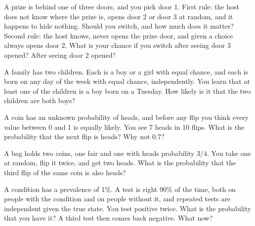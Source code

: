 \begin{question}\label{iq:iv1:conditional-probability-and-bayes:10}
A prize is behind one of three doors, and you pick door 1. First rule: the host does not know where the prize is, opens door 2 or door 3 at random, and it happens to hide nothing. Should you switch, and how much does it matter? Second rule: the host knows, never opens the prize door, and given a choice always opens door 2. What is your chance if you switch after seeing door 3 opened? After seeing door 2 opened?
\end{question}

\begin{question}\label{iq:iv1:conditional-probability-and-bayes:11}
A family has two children. Each is a boy or a girl with equal chance, and each is born on any day of the week with equal chance, independently. You learn that at least one of the children is a boy born on a Tuesday. How likely is it that the two children are both boys?
\end{question}

\begin{question}\label{iq:iv1:conditional-probability-and-bayes:12}
A coin has an unknown probability of heads, and before any flip you think every value between 0 and 1 is equally likely. You see 7 heads in 10 flips. What is the probability that the next flip is heads? Why not $0.7$?
\end{question}

\begin{question}\label{iq:iv1:conditional-probability-and-bayes:13}
A bag holds two coins, one fair and one with heads probability $3/4$. You take one at random, flip it twice, and get two heads. What is the probability that the third flip of the same coin is also heads?
\end{question}

\begin{question}\label{iq:iv1:conditional-probability-and-bayes:14}
A condition has a prevalence of 1\%. A test is right 90\% of the time, both on people with the condition and on people without it, and repeated tests are independent given the true state. You test positive twice. What is the probability that you have it? A third test then comes back negative. What now?
\end{question}

